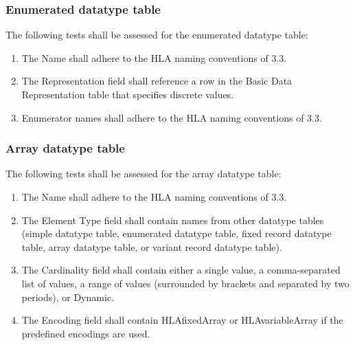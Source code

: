 \subsubsection{Enumerated datatype table}
The following tests shall be assessed for the enumerated datatype table:

\newpage
\begin{enumerate}[label=\arabic*),leftmargin=42pt,labelsep=8pt,itemsep=1.2pt,topsep=0pt]
\item The Name shall adhere to the HLA naming conventions of 3.3.
\item The Representation field shall reference a row in the Basic Data Representation table that specifies discrete values.
\item Enumerator names shall adhere to the HLA naming conventions of 3.3.
\end{enumerate}

\subsubsection{Array datatype table}
The following tests shall be assessed for the array datatype table:
\begin{enumerate}[label=\arabic*),leftmargin=42pt,labelsep=8pt,itemsep=1.2pt,topsep=2pt]
\item The Name shall adhere to the HLA naming conventions of 3.3.
\item The Element Type field shall contain names from other datatype tables (simple datatype table, enumerated datatype table, fixed record datatype table, array datatype table, or variant record datatype table).
\item The Cardinality field shall contain either a single value, a comma-separated list of values, a range of values (surrounded by brackets and separated by two periods), or Dynamic.
\item The Encoding field shall contain HLAfixedArray or HLAvariableArray if the predefined encodings are used.
\end{enumerate}

